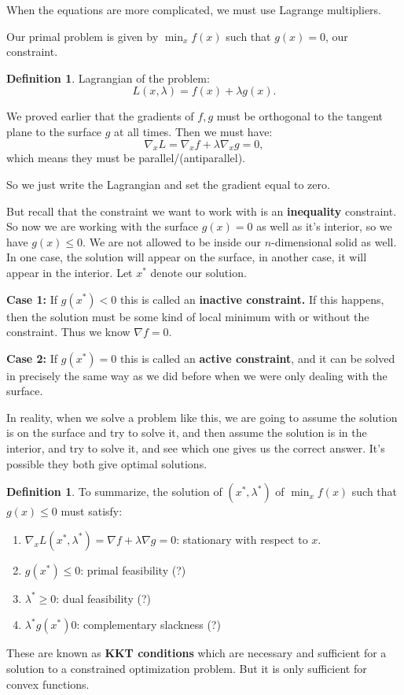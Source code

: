 \documentclass{amsbook}
\theoremstyle{plain}
\numberwithin{section}{chapter}
\numberwithin{equation}{chapter}
\theoremstyle{definition}
\newtheorem{Def}[theorem]{Definition}
\theoremstyle{remark}
\begin{document}
When the equations are more complicated, we must use Lagrange multipliers. 

Our primal problem is given by $\min_x f(x)$ such that $g(x) = 0$, our constraint. 

\begin{Def}
Lagrangian of the problem:
$$
L(x,\lambda)  = f(x) + \lambda g(x).
$$
\end{Def}

We proved earlier that the gradients of $f,g$ must be orthogonal to the tangent plane to the surface $g$ at all times. Then we must have:
$$
\nabla_xL = \nabla_xf + \lambda \nabla_x g = 0,
$$
which means they must be parallel/(antiparallel).

So we just write the Lagrangian and set the gradient equal to zero. 


But recall that the constraint we want to work with is an \textbf{inequality} constraint. So now we are working with the surface $g(x) = 0$ as well as it's interior, so we have $g(x) \leq 0$. We are not allowed to be inside our $n$-dimensional solid as well. In one case, the solution will appear on the surface, in another case, it will appear in the interior. Let $x^*$ denote our solution. 

\textbf{Case 1: }If $g(x^*) < 0$ this is called an \textbf{inactive constraint. }If this happens, then the solution must be some kind of local minimum with or without the constraint. Thus we know $\nabla f = 0$. 

\textbf{Case 2: }If $g(x^*) = 0$ this is called an \textbf{active constraint}, and it can be solved in precisely the same way as we did before when we were only dealing with the surface. 


In reality, when we solve a problem like this, we are going to assume the solution is on the surface and try to solve it, and then assume the solution is in the interior, and try to solve it, and see which one gives us the correct answer. It's possible they both give optimal solutions. 

\begin{Def}
To summarize, the solution of $(x^*,\lambda^*)$ of $\min_x f(x)$ such that $g(x) \leq 0$ must satisfy:
\begin{enumerate}
\item $\nabla_x L(x^*,\lambda^*) = \nabla f + \lambda \nabla g = 0$: stationary with respect to $x$.
\item $g(x^*) \leq 0$: primal feasibility (?)
\item $\lambda^* \geq 0$: dual feasibility (?)
\item $\lambda^*g(x^*) 0$: complementary slackness (?)
\end{enumerate}
These are known as \textbf{KKT conditions} which are necessary and sufficient for a solution to a constrained optimization problem. But it is only sufficient for convex functions. 
\end{Def}
\end{document}
